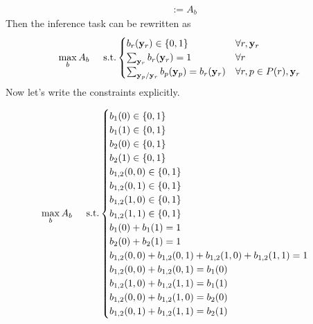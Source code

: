{\begin{align*}
	& := A_b
\end{align*}
Then the inference task can be rewritten as  
\begin{align*}
\max_{b} A_b \hspace{0.5cm} \text{s.t.} 
\begin{cases}
	b_r(\mathbf{y}_r) \in \{0, 1\} &\forall r, \mathbf{y}_r \\
	\sum_{\mathbf{y}_r} b_r(\mathbf{y}_r) = 1 &\forall r\\
	\sum_{\mathbf{y}_p / \mathbf{y}_r}  b_p(\mathbf{y}_p) = b_r(\mathbf{y}_r) &\forall r, p \in P(r), \mathbf{y}_r
\end{cases}
\end{align*}
Now let's  write the constraints explicitly. 

\begin{align*}
\max_{b} A_b \hspace{0.5cm} \text{s.t.} 
\begin{cases}
	b_1(0) \in \{0, 1\}\\
	b_1(1) \in \{0, 1\}\\
	b_2(0) \in \{0, 1\}\\
	b_2(1) \in \{0, 1\}\\
	b_{1,2}(0, 0) \in \{0, 1\}\\
	b_{1,2}(0, 1) \in \{0, 1\}\\
	b_{1,2}(1, 0) \in \{0, 1\}\\
	b_{1,2}(1, 1) \in \{0, 1\}\\
	b_1(0) + b_1(1) = 1\\
	b_2(0) + b_2(1) = 1\\
	b_{1,2}(0, 0) + b_{1,2}(0, 1) + b_{1,2}(1, 0) + b_{1,2}(1, 1) = 1\\
	b_{1, 2}(0, 0) + b_{1, 2}(0, 1) = b_1(0)\\
	b_{1, 2}(1, 0) + b_{1, 2}(1, 1) = b_1(1)\\
	b_{1, 2}(0, 0) + b_{1, 2}(1, 0) = b_2(0)\\
	b_{1, 2}(0, 1) + b_{1, 2}(1, 1) = b_2(1)
\end{cases}
\end{align*}
}

\newcommand{\MRFStudSolBB}{
Note that the new cost function is 
\[ b_1(0) + 2b_1(1) + b_2(0) + 2b_2(1) - b_{1, 2}(0, 0) + 2b_{1, 2}(0, 1) - b_{1, 2}(1, 0) - b_{1, 2}(1, 1) \]
By simply looking at the previous item we can see that the maximum value is achieved when letting $b_{1, 2}(0, 1) = 1$. Then the solution is
The solution is:
\begin{align*}
b_1(0) &= 1\\
b_1(1) &= 0\\
b_2(0) &= 0\\
b_2(1) &= 1\\
b_{1, 2}(0, 0) &= 0\\
b_{1, 2}(0, 1) &= 1\\
b_{1, 2}(1, 0) &= 0\\
b_{1, 2}(1, 1) &= 0
\end{align*}
And then the value of our cost function is:
\[1 + 2(0) + 0 + 2(1) - 0 + 2(1) - 0 - 0 = 1 + 2 + 2 = 5\]
}

